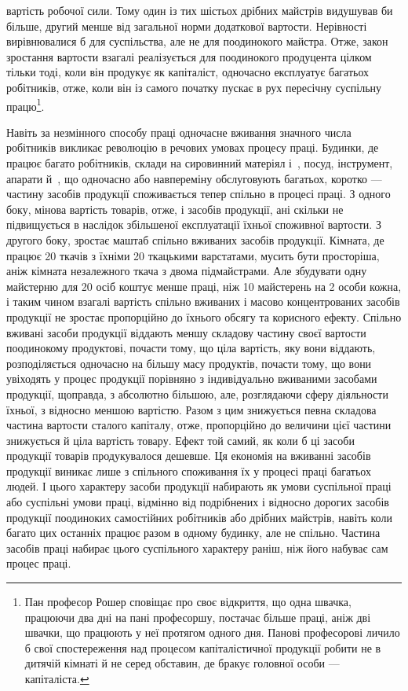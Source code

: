 \parcont{}  %
вартість робочої сили. Тому один із тих шістьох дрібних майстрів
видушував би більше, другий менше від загальної норми додаткової
вартости. Нерівності вирівнювалися б для суспільства, але
не для поодинокого майстра. Отже, закон зростання вартости
взагалі реалізується для поодинокого продуцента цілком тільки
тоді, коли він продукує як капіталіст, одночасно експлуатує
багатьох робітників, отже, коли він із самого початку пускає в
рух пересічну суспільну працю\footnote{
Пан професор Рошер сповіщає про своє відкриття, що одна швачка,
працюючи два дні на пані професоршу, постачає більше праці, аніж дві
швачки, що працюють у неї протягом одного дня. Панові професорові
личило б свої спостереження над процесом капіталістичної продукції
робити не в дитячій кімнаті й не серед обставин, де бракує головної особи —
капіталіста.
}.

Навіть за незмінного способу праці одночасне вживання
значного числа робітників викликає революцію в речових умовах
процесу праці. Будинки, де працює багато робітників, склади
на сировинний матеріял і~, посуд, інструмент, апарати й~,
що одночасно або навпереміну обслуговують багатьох, коротко —
частину засобів продукції споживається тепер спільно в процесі
праці. З одного боку, мінова вартість товарів, отже, і засобів
продукції, ані скільки не підвищується в наслідок збільшеної
експлуатації їхньої споживної вартости. З другого боку,
зростає маштаб спільно вживаних засобів продукції. Кімната,
де працює 20 ткачів з їхніми 20 ткацькими варстатами, мусить
бути просторіша, аніж кімната незалежного ткача з двома підмайстрами.
Але збудувати одну майстерню для 20 осіб коштує
менше праці, ніж 10 майстерень на 2 особи кожна, і таким чином
взагалі вартість спільно вживаних і масово концентрованих засобів
продукції не зростає пропорційно до їхнього обсягу та корисного
ефекту. Спільно вживані засоби продукції віддають меншу
складову частину своєї вартости поодинокому продуктові, почасти
тому, що ціла вартість, яку вони віддають, розподіляється
одночасно на більшу масу продуктів, почасти тому, що вони увіходять
у процес продукції порівняно з індивідуально вживаними
засобами продукції, щоправда, з абсолютно більшою, але, розглядаючи
сферу діяльности їхньої, з відносно меншою вартістю.
Разом з цим знижується певна складова частина вартости сталого
капіталу, отже, пропорційно до величини цієї частини знижується
й ціла вартість товару. Ефект той самий, як коли б ці засоби
продукції товарів продукувалося дешевше. Ця економія на вживанні
засобів продукції виникає лише з спільного споживання
їх у процесі праці багатьох людей. І цього характеру засоби продукції
набирають як умови суспільної праці або суспільні умови
праці, відмінно від подрібнених і відносно дорогих засобів продукції
поодиноких самостійних робітників або дрібних майстрів,
навіть коли багато цих останніх працює разом в одному будинку,
але не спільно. Частина засобів праці набирає цього суспільного
характеру раніш, ніж його набуває сам процес праці.
